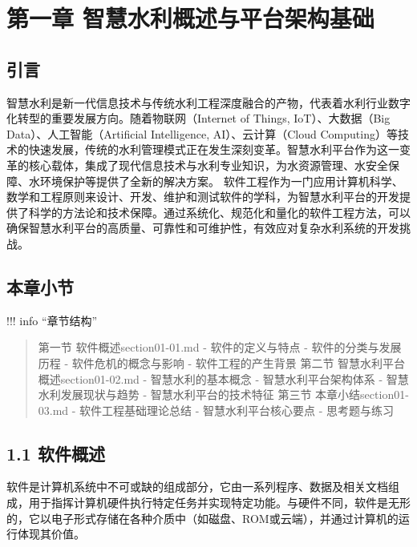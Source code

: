 \section{第一章
智慧水利概述与平台架构基础}\label{ux7b2cux4e00ux7ae0-ux667aux6167ux6c34ux5229ux6982ux8ff0ux4e0eux5e73ux53f0ux67b6ux6784ux57faux7840}
\learningobjectives{ }\subsection{引言}\label{ux5f15ux8a00} 智慧水利是新一代信息技术与传统水利工程深度融合的产物，代表着水利行业数字化转型的重要发展方向。随着物联网（Internet
of Things, IoT）、大数据（Big Data）、人工智能（Artificial Intelligence, AI）、云计算（Cloud
Computing）等技术的快速发展，传统的水利管理模式正在发生深刻变革。智慧水利平台作为这一变革的核心载体，集成了现代信息技术与水利专业知识，为水资源管理、水安全保障、水环境保护等提供了全新的解决方案。
软件工程作为一门应用计算机科学、数学和工程原则来设计、开发、维护和测试软件的学科，为智慧水利平台的开发提供了科学的方法论和技术保障。通过系统化、规范化和量化的软件工程方法，可以确保智慧水利平台的高质量、可靠性和可维护性，有效应对复杂水利系统的开发挑战。
\subsection{本章小节}\label{ux672cux7ae0ux5c0fux8282} !!! info ``章节结构'' \begin{quote}
 第一节 软件概述section01-01.md -
软件的定义与特点 - 软件的分类与发展历程 - 软件危机的概念与影响 - 软件工程的产生背景 第二节 智慧水利平台概述section01-02.md - 智慧水利的基本概念 - 智慧水利平台架构体系 - 智慧水利发展现状与趋势 -
智慧水利平台的技术特征 第三节 本章小结section01-03.md - 软件工程基础理论总结 - 智慧水利平台核心要点 - 思考题与练习 
\end{quote} \keypoints{ }\subsection{1.1
软件概述}\label{ux8f6fux4ef6ux6982ux8ff0}
软件是计算机系统中不可或缺的组成部分，它由一系列程序、数据及相关文档组成，用于指挥计算机硬件执行特定任务并实现特定功能。与硬件不同，软件是无形的，它以电子形式存储在各种介质中（如磁盘、ROM或云端），并通过计算机的运行体现其价值。
